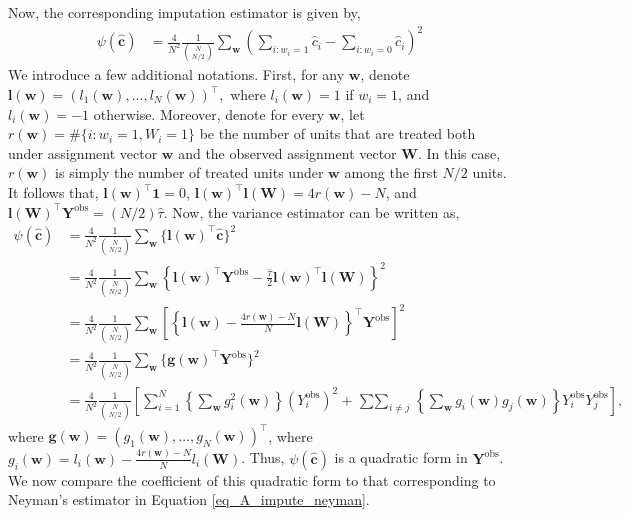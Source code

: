 \documentclass[12pt]{article}
\begin{document}
Now, the corresponding imputation estimator is given by,
\begin{align}
    \psi(\hat{\bm{c}}) & = \frac{4}{N^2}\frac{1}{\binom{N}{N/2}}\sum_{\bm{w}} \left(\sum_{i:w_{i} = 1}\hat{c}_{i} - \sum_{i:w_{i} = 0}\hat{c}_{i} \right)^2 
\end{align}
We introduce a few additional notations. First, for any $\bm{w}$, denote $\bm{l}(\bm{w}) = (l_1(\bm{w}),...,l_N(\bm{w}))^\top,$ where $l_i(\bm{w}) = 1$ if $w_i = 1$, and $l_i(\bm{w}) = -1$ otherwise. Moreover, denote for every $\bm{w}$, let $r(\bm{w}) = \#\{i:w_i = 1, W_i = 1\}$ be the number of units that are treated both under assignment vector $\bm{w}$ and the observed assignment vector $\bm{W}$. In this case, $r(\bm{w})$ is simply the number of treated units under $\bm{w}$ among the first $N/2$ units. It follows that, $\bm{l}(\bm{w})^\top \bm{1} = 0$, $\bm{l}(\bm{w})^\top \bm{l}(\bm{W}) = 4r(\bm{w}) - N$, and $\bm{l}(\bm{W})^\top \bm{Y}^{\text{obs}} = (N/2)\hat{\tau}$. Now, the variance estimator can be written as,
\begin{align}
     \psi(\hat{\bm{c}}) & = \frac{4}{N^2}\frac{1}{\binom{N}{N/2}}\sum_{\bm{w}}\{\bm{l}(\bm{w})^\top \hat{\bm{c}}\}^2 \nonumber\\
     & = \frac{4}{N^2}\frac{1}{\binom{N}{N/2}}\sum_{\bm{w}} \left\{\bm{l}(\bm{w})^\top\bm{Y}^{\text{obs}} - \frac{\hat{\tau}}{2}\bm{l}(\bm{w})^\top\bm{l}(\bm{W}) \right\}^2 \nonumber \\
     & = \frac{4}{N^2}\frac{1}{\binom{N}{N/2}}\sum_{\bm{w}} \left[ \left\{ \bm{l}(\bm{w}) - \frac{4r(\bm{w}) - N}{N}\bm{l}(\bm{W}) \right\}^\top \bm{Y}^{\text{obs}} \right]^2 \nonumber \\ 
     & = \frac{4}{N^2}\frac{1}{\binom{N}{N/2}}\sum_{\bm{w}}\{\bm{g}(\bm{w})^\top\bm{Y}^{\text{obs}}\}^2 \nonumber \\
     & = \frac{4}{N^2}\frac{1}{\binom{N}{N/2}}\left[ \sum_{i=1}^{N} \left\{\sum_{\bm{w}}g^2_i(\bm{w})\right\}(Y^{\text{obs}}_i)^2 + \mathop{\sum\sum}_{i \neq j}\left\{\sum_{\bm{w}}g_i(\bm{w})g_j(\bm{w})\right\}Y^{\text{obs}}_i Y^{\text{obs}}_j  \right], \label{eq_A_impute_hat1}
\end{align}
where $\bm{g}(\bm{w}) = (g_1(\bm{w}),...,g_N(\bm{w}))^\top$, where $g_i(\bm{w}) = l_i(\bm{w})  - \frac{4r(\bm{w}) - N}{N}l_i(\bm{W})$. Thus, $\psi(\hat{\bm{c}})$ is a quadratic form in $\bm{Y}^{\text{obs}}$. We now compare the coefficient of this quadratic form to that corresponding to Neyman's estimator in Equation \ref{eq_A_impute_neyman}.
\end{document}
